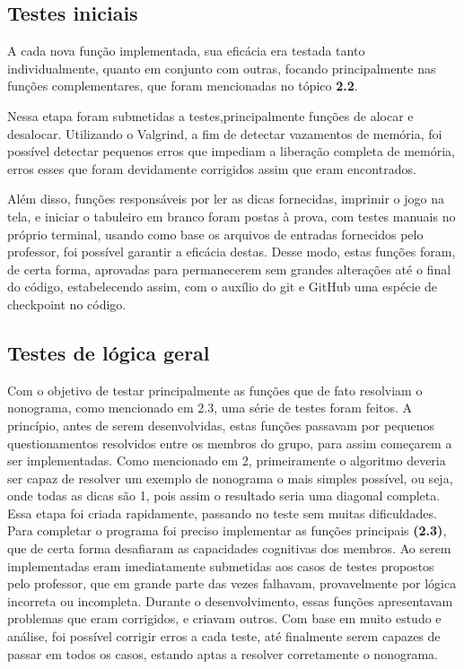 \documentclass{article}
\begin{document}
\subsection{Testes iniciais}

A cada nova função implementada, sua eficácia era testada tanto individualmente, quanto em conjunto com outras, focando principalmente nas funções complementares, que foram mencionadas no tópico \textbf{2.2}.

Nessa etapa foram submetidas a testes,principalmente funções de alocar e desalocar. Utilizando o Valgrind, a fim de detectar vazamentos de memória, foi possível detectar pequenos erros que impediam a liberação completa de memória, erros esses que foram devidamente corrigidos assim que eram encontrados.

Além disso, funções responsáveis por ler as dicas fornecidas, imprimir o jogo na tela, e iniciar o tabuleiro em branco foram postas à prova, com testes manuais no próprio terminal, usando como base os arquivos de entradas fornecidos pelo professor, foi possível garantir a eficácia destas. Desse modo, estas funções foram, de certa forma, aprovadas para permanecerem sem grandes alterações até o final do código, estabelecendo assim, com o auxílio do git e GitHub uma espécie de checkpoint no código.

\subsection{Testes de lógica geral}
Com o objetivo de testar principalmente as funções que de fato resolviam o nonograma, como mencionado em 2.3, uma série de testes foram feitos.
A princípio, antes de serem desenvolvidas, estas funções passavam por pequenos questionamentos resolvidos entre os membros do grupo, para assim começarem a ser implementadas. Como mencionado em 2, primeiramente o algoritmo deveria ser capaz de resolver um exemplo de nonograma o mais simples possível, ou seja, onde todas as dicas são 1, pois assim o resultado seria uma diagonal completa. Essa etapa foi criada rapidamente, passando no teste sem muitas dificuldades.
Para completar o programa foi preciso implementar as funções principais \textbf{(2.3)}, que de certa forma desafiaram as capacidades cognitivas dos membros. Ao serem implementadas eram imediatamente submetidas aos casos de testes propostos pelo professor, que em grande parte das vezes falhavam, provavelmente por lógica incorreta ou incompleta. Durante o desenvolvimento, essas funções apresentavam problemas que eram corrigidos, e criavam outros. Com base em muito estudo e análise, foi possível corrigir erros a cada teste, até finalmente serem capazes de passar em todos os casos, estando aptas a resolver corretamente o nonograma.
\end{document}
